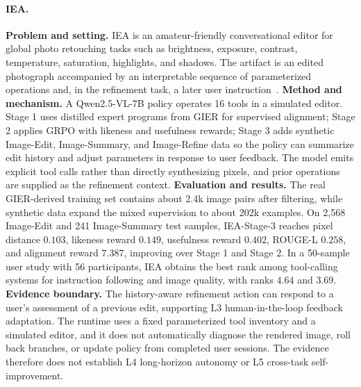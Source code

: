 \paragraph{IEA.}
\textbf{Problem and setting.} IEA is an amateur-friendly conversational editor for global photo retouching tasks such as brightness, exposure, contrast, temperature, saturation, highlights, and shadows. The artifact is an edited photograph accompanied by an interpretable sequence of parameterized operations and, in the refinement task, a later user instruction~\cite{avg260608016}. \textbf{Method and mechanism.} A Qwen2.5-VL-7B policy operates 16 tools in a simulated editor. Stage 1 uses distilled expert programs from GIER for supervised alignment; Stage 2 applies GRPO with likeness and usefulness rewards; Stage 3 adds synthetic Image-Edit, Image-Summary, and Image-Refine data so the policy can summarize edit history and adjust parameters in response to user feedback. The model emits explicit tool calls rather than directly synthesizing pixels, and prior operations are supplied as the refinement context. \textbf{Evaluation and results.} The real GIER-derived training set contains about 2.4k image pairs after filtering, while synthetic data expand the mixed supervision to about 202k examples. On 2,568 Image-Edit and 241 Image-Summary test samples, IEA-Stage-3 reaches pixel distance $0.103$, likeness reward $0.149$, usefulness reward $0.402$, ROUGE-L $0.258$, and alignment reward $7.387$, improving over Stage 1 and Stage 2. In a 50-sample user study with 56 participants, IEA obtains the best rank among tool-calling systems for instruction following and image quality, with ranks $4.64$ and $3.69$. \textbf{Evidence boundary.} The history-aware refinement action can respond to a user's assessment of a previous edit, supporting L3 human-in-the-loop feedback adaptation. The runtime uses a fixed parameterized tool inventory and a simulated editor, and it does not automatically diagnose the rendered image, roll back branches, or update policy from completed user sessions. The evidence therefore does not establish L4 long-horizon autonomy or L5 cross-task self-improvement.

